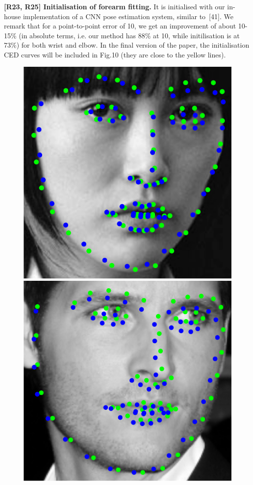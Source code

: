 \documentclass[10pt,twocolumn,letterpaper]{article}
\begin{document}
\textbf{[R23, R25] Initialisation of forearm fitting.}
It is initialised with our in-house implementation of a 
CNN pose estimation system, similar to~[41]. We remark that for a point-to-point error of 10, we get an improvement of about 10-15\% (in absolute terms, i.e. our method has 88\% at 10, while initilisation is at 73\%) for both wrist and elbow. In the final version of the paper, the initialisation CED curves will be included in Fig.10 (they are close to the yellow lines).
\begin{figure}[t!]
    \newcommand{\ofh}{0.24\columnwidth}
    \centering
    \includegraphics[height=\ofh]{face_all}
    \includegraphics[height=\ofh]{face2_all}

\end{figure}
\end{document}
